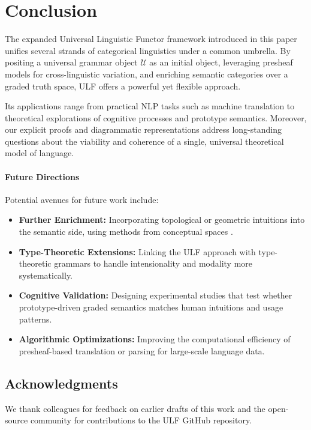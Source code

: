 \documentclass[12pt]{article}
\theoremstyle{plain}
\theoremstyle{definition}
\begin{document}
\section{Conclusion}
The expanded Universal Linguistic Functor framework introduced in this paper unifies several strands of categorical linguistics under a common umbrella. By positing a universal grammar object \(\mathcal{U}\) as an initial object, leveraging presheaf models for cross-linguistic variation, and enriching semantic categories over a graded truth space, ULF offers a powerful yet flexible approach. 

Its applications range from practical NLP tasks such as machine translation to theoretical explorations of cognitive processes and prototype semantics. Moreover, our explicit proofs and diagrammatic representations address long-standing questions about the viability and coherence of a single, universal theoretical model of language. 

\paragraph{Future Directions}
Potential avenues for future work include:
\begin{itemize}
    \item \textbf{Further Enrichment:} Incorporating topological or geometric intuitions into the semantic side, using methods from conceptual spaces \cite{Gardenfors}.
    \item \textbf{Type-Theoretic Extensions:} Linking the ULF approach with type-theoretic grammars to handle intensionality and modality more systematically.
    \item \textbf{Cognitive Validation:} Designing experimental studies that test whether prototype-driven graded semantics matches human intuitions and usage patterns.
    \item \textbf{Algorithmic Optimizations:} Improving the computational efficiency of presheaf-based translation or parsing for large-scale language data.
\end{itemize}

\subsection*{Acknowledgments}
We thank colleagues for feedback on earlier drafts of this work and the open-source community for contributions to the ULF GitHub repository.
\end{document}
